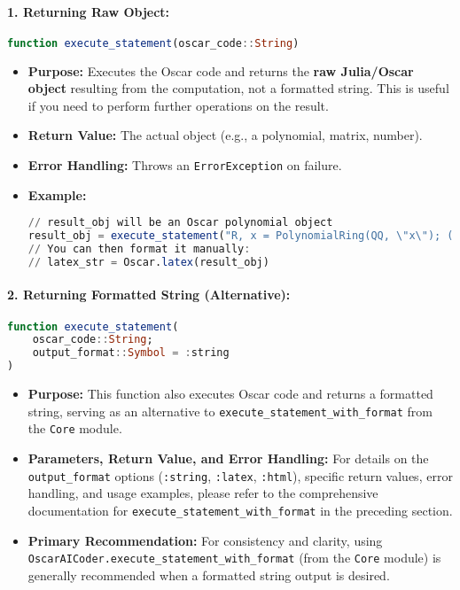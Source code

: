 \documentclass[11pt,a4paper]{article}
\newcommand{\code}[1]{\texttt{#1}}
\newcommand{\important}[1]{\textbf{#1}}
\newcommand{\func}[1]{\texttt{#1}}
\newcommand{\modname}[1]{\texttt{#1}}
\providecommand{\code}[1]{\texttt{\color{blue!70!black}#1}}
\providecommand{\important}[1]{\textbf{\color{red!70!black}#1}}
\begin{document}
\paragraph{1. Returning Raw Object:}
\begin{lstlisting}[language=Julia, basicstyle=\footnotesize\ttfamily\color{black}, keywordstyle=\color{blue}, commentstyle=\color{green!50!black}, stringstyle=\color{red}]
function execute_statement(oscar_code::String)
\end{lstlisting}
\begin{itemize}
    \item \textbf{Purpose:} Executes the Oscar code and returns the \important{raw Julia/Oscar object} resulting from the computation, not a formatted string. This is useful if you need to perform further operations on the result.
    \item \textbf{Return Value:} The actual object (e.g., a polynomial, matrix, number).
    \item \textbf{Error Handling:} Throws an \code{ErrorException} on failure.
    \item \textbf{Example:}
    \begin{lstlisting}[language=Julia]
// result_obj will be an Oscar polynomial object
result_obj = execute_statement("R, x = PolynomialRing(QQ, \"x\"); (x+1)^2")
// You can then format it manually:
// latex_str = Oscar.latex(result_obj)
    \end{lstlisting}
\end{itemize}

\paragraph{2. Returning Formatted String (Alternative):}
\begin{lstlisting}[language=Julia, basicstyle=\footnotesize\ttfamily\color{black}, keywordstyle=\color{blue}, commentstyle=\color{green!50!black}, stringstyle=\color{red}]
function execute_statement(
    oscar_code::String;
    output_format::Symbol = :string
)
\end{lstlisting}
\begin{itemize}
    \item \textbf{Purpose:} This function also executes Oscar code and returns a formatted string, serving as an alternative to \func{execute\_statement\_with\_format} from the \modname{Core} module.
    \item \textbf{Parameters, Return Value, and Error Handling:} For details on the \code{output\_format} options (\code{:string}, \code{:latex}, \code{:html}), specific return values, error handling, and usage examples, please refer to the comprehensive documentation for \func{execute\_statement\_with\_format} in the preceding section.
    \item \textbf{Primary Recommendation:} For consistency and clarity, using \func{OscarAICoder.execute\_statement\_with\_format} (from the \modname{Core} module) is generally recommended when a formatted string output is desired.
\end{itemize}
\end{document}
